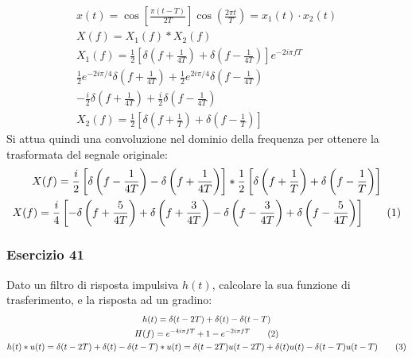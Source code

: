 \documentclass{article}
\newcommand{\tageq}{\tag{\stepcounter{equation}\theequation}}
\begin{document}
\begin{gather*}
    x(t)=\cos\left[\displaystyle\frac{\pi(t-T)}{2T}\right]\cos\left(\frac{2\pi t}{T}\right)=x_1(t)\cdot x_2(t)\\
    X(f)=X_1(f)*X_2(f)\\
    X_1(f)=\displaystyle\frac{1}{2}\left[\delta\left(f+\frac{1}{4T}\right)+\delta\left(f-\frac{1}{4T}\right)\right]e^{-2i\pi fT}\\
    \displaystyle\frac{1}{2}e^{-2i\pi/4}\delta\left(f+\frac{1}{4T}\right)+\frac{1}{2}e^{2i\pi /4}\delta\left(f-\frac{1}{4T}\right)\\
    \displaystyle-\frac{i}{2}\delta\left(f+\frac{1}{4T}\right)+\frac{i}{2}\delta\left(f-\frac{1}{4T}\right)\\
    X_2(f)=\displaystyle\frac{1}{2}\left[\delta\left(f+\frac{1}{T}\right)+\delta\left(f-\frac{1}{T}\right)\right]
\end{gather*}
Si attua quindi una convoluzione nel dominio della frequenza per ottenere la trasformata del segnale originale:
\begin{gather*}
    X(f)=\displaystyle\frac{i}{2}\left[\delta\left(f-\frac{1}{4T}\right)-\delta\left(f+\frac{1}{4T}\right)\right]*\frac{1}{2}\left[\delta\left(f+\frac{1}{T}\right)+\delta\left(f-\frac{1}{T}\right)\right]\\
    X(f)=\displaystyle\frac{i}{4}\left[-\delta\left(f+\frac{5}{4T}\right)+\delta\left(f+\frac{3}{4T}\right)-\delta\left(f-\frac{3}{4T}\right)+\delta\left(f-\frac{5}{4T}\right)\right]\tageq
\end{gather*}

\subsubsection*{Esercizio 41}

Dato un filtro di risposta impulsiva $h(t)$, calcolare la sua funzione di trasferimento, e la risposta ad un gradino:
\begin{gather*}
    h(t)=\delta(t-2T)+\delta(t)-\delta(t-T)\\
    H(f)=e^{-4i\pi fT}+1-e^{-2i\pi fT}\tageq\\
    h(t)*u(t)=\delta(t-2T)+\delta(t)-\delta(t-T)*u(t)=\delta(t-2T)u(t-2T)+\delta(t)u(t)-\delta(t-T)u(t-T)\tageq
\end{gather*}
\begin{center}
\end{center}
\end{document}
